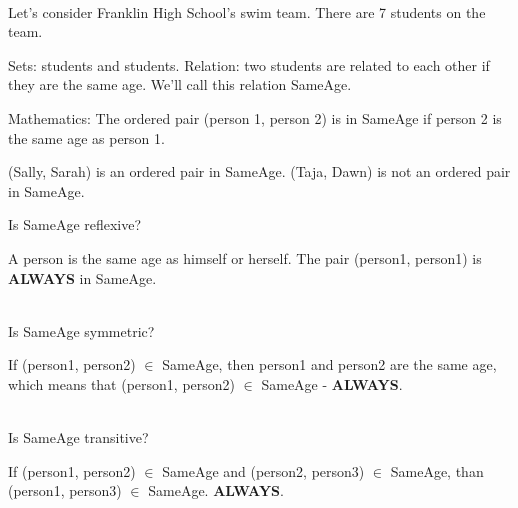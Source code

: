 \documentclass{ximera}
\begin{document}
\begin{example} 
\quad \\
Let's consider Franklin High School's swim team. There are 7 students on the team.




Sets: students and students.
Relation: two students are related to each other if they are the same age. We'll call this relation SameAge.

Mathematics: The ordered pair (person 1, person 2) is in SameAge if person 2 is the same age as person 1. 

(Sally, Sarah) is an ordered pair in SameAge.  (Taja, Dawn) is not an ordered pair in SameAge.

Is SameAge reflexive?  
\begin{multipleChoice}
\end{multipleChoice}
\begin{feedback}
A person is the same age as himself or herself. The pair (person1, person1) is \textbf{ALWAYS} in SameAge.
\end{feedback}
\quad \\

Is SameAge symmetric? 
\begin{multipleChoice}
\end{multipleChoice}
\begin{feedback}
If (person1, person2) $\in$ SameAge, then person1 and person2 are the same age, which means that  (person1, person2) $\in$ SameAge - \textbf{ALWAYS}.
\end{feedback}
\quad \\

Is SameAge transitive? 
\begin{multipleChoice}
\end{multipleChoice}
\begin{feedback}
If (person1, person2) $\in$ SameAge and (person2, person3) $\in$ SameAge, than (person1, person3) $\in$ SameAge. \textbf{ALWAYS}.  
\end{feedback}


\end{example}
\quad \\
\end{document}
